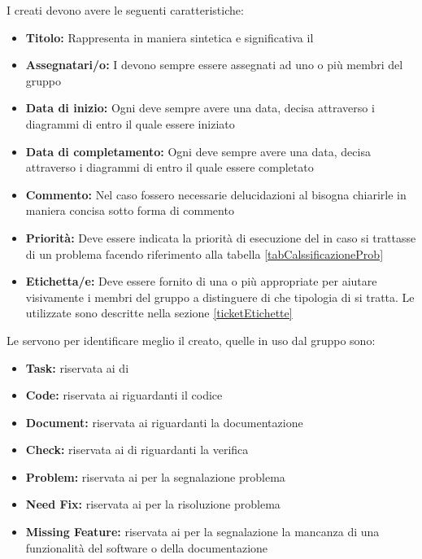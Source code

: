 \documentclass[12pt,a4paper]{article}
\begin{document}
\label{ticketStruttura}
I  creati devono avere le seguenti caratteristiche:
\begin{itemize}
	\item \textbf{Titolo:} Rappresenta in maniera sintetica e significativa il 
	\item \textbf{Assegnatari/o:} I  devono sempre essere assegnati ad uno o più membri del gruppo
	\item \textbf{Data di inizio:} Ogni  deve sempre avere una data, decisa attraverso i diagrammi di  entro il quale essere iniziato
	\item \textbf{Data di completamento:} Ogni  deve sempre avere una data, decisa attraverso i diagrammi di  entro il quale essere completato
	\item \textbf{Commento:} Nel caso fossero necessarie delucidazioni al  bisogna chiarirle in maniera concisa sotto forma di commento
	\item \textbf{Priorità:} Deve essere indicata la priorità di esecuzione del  in caso si trattasse di un problema facendo riferimento alla tabella \ref{tabCalssificazioneProb}
	\item \textbf{Etichetta/e:} Deve essere fornito di una o più appropriate  per aiutare visivamente i membri del gruppo a distinguere di che tipologia di  si tratta. Le  utilizzate sono descritte nella sezione \ref{ticketEtichette}
\end{itemize}

\label{ticketEtichette}
Le  servono per identificare meglio il  creato, quelle in uso dal gruppo sono:
\begin{itemize}
	\item \textbf{Task:} riservata ai  di 
	\item \textbf{Code:} riservata ai  riguardanti il codice
	\item \textbf{Document:} riservata ai  riguardanti la documentazione
	\item \textbf{Check:} riservata ai  di riguardanti la verifica
	\item \textbf{Problem:} riservata ai  per la segnalazione problema
	\item \textbf{Need Fix:} riservata ai  per la risoluzione problema
	\item \textbf{Missing Feature:} riservata ai  per la segnalazione la mancanza di una funzionalità del software o della documentazione
\end{itemize}
\end{document}
